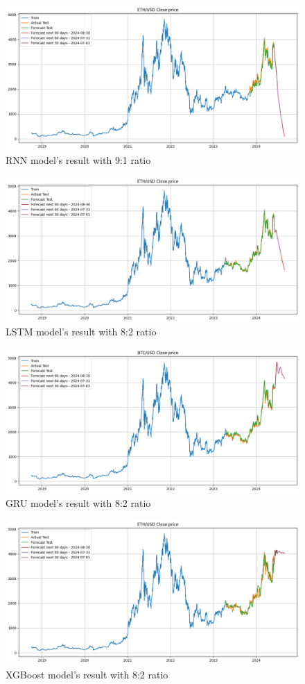 \documentclass{ieeeojies}
\begin{document}
\begin{figure}[H]
    \centering
    \includegraphics[width=0.8\linewidth]{./././visualize/RNN/ETH-90-10.png}
    \caption{RNN model’s result with 9:1 ratio}
    \label{fig:24}
\end{figure}
\begin{figure}[H]
    \centering
    \includegraphics[width=0.8\linewidth]{./././visualize/LSTM/ETH-80-20.png}
    \caption{LSTM model’s result with 8:2 ratio}
    \label{fig:25}
\end{figure}
\begin{figure}[H]
    \centering
    \includegraphics[width=0.8\linewidth]{./././visualize/GRU/ETH-80-20.png}
    \caption{GRU model’s result with 8:2 ratio}
    \label{fig:26}
\end{figure}
\begin{figure}[H]
    \centering
    \includegraphics[width=0.8\linewidth]{./././visualize/XGBoost/ETH-80-20.png}
    \caption{XGBoost model’s result with 8:2 ratio}
    \label{fig:27}
\end{figure}
\end{document}
